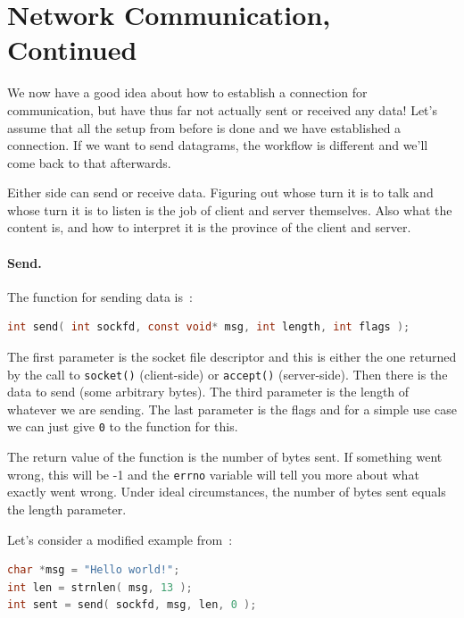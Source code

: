 




\section*{Network Communication, Continued}

We now have a good idea about how to establish a connection for communication, but have thus far not actually sent or received any data! Let's assume that all the setup from before is done and we have established a connection. If we want to send datagrams, the workflow is different and we'll come back to that afterwards.

Either side can send or receive data. Figuring out whose turn it is to talk and whose turn it is to listen is the job of client and server themselves. Also what the content is, and how to interpret it is the province of the client and server.

\paragraph{Send.} The function for sending data is~\cite{apunix}:
\begin{lstlisting}[language=C]
int send( int sockfd, const void* msg, int length, int flags );
\end{lstlisting}

The first parameter is the socket file descriptor and this is either the one returned by the call to \texttt{socket()} (client-side) or \texttt{accept()} (server-side). Then there is the data to send (some arbitrary bytes). The third parameter is the length of whatever we are sending. The last parameter is the flags and for a simple use case we can just give \texttt{0} to the function for this.

The return value of the function is the number of bytes sent. If something went wrong, this will be -1 and the \texttt{errno} variable will tell you more about what exactly went wrong. Under ideal circumstances, the number of bytes sent equals the length parameter.

Let's consider a modified example from~\cite{getaddrinfo}:
\begin{lstlisting}[language=C]
char *msg = "Hello world!";
int len = strnlen( msg, 13 );
int sent = send( sockfd, msg, len, 0 );
\end{lstlisting}


